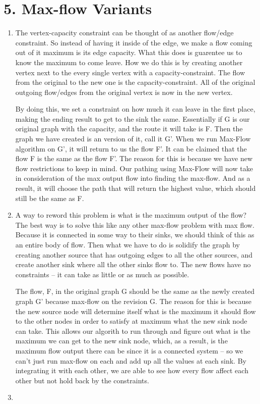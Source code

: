 \documentclass[11pt]{article}
\newenvironment{qparts}{\begin{enumerate}[{(}a{)}]}{\end{enumerate}}
\begin{document}
\section*{5. Max-flow Variants}
\begin{qparts}
\item The vertex-capacity constraint can be thought of as another flow/edge constraint. So instead of having it inside of the edge, we make a flow coming out of it maximum is its edge capacity. What this does is guarentee us to know the maximum to come leave. How we do this is by creating another vertex next to the every single vertex with a capacity-constraint. The flow from the original to the new one is the capacity-constraint. All of the original outgoing flow/edges from the original vertex is now in the new vertex. 

By doing this, we set a constraint on how much it can leave in the first place, making the ending result to get to the sink the same. Essentially if G is our original graph with the capacity, and the route it will take is F. Then the graph we have created is an version of it, call it G'. When we run Max-Flow algorithm on G', it will return to us the flow F'. It can be claimed that the flow F is the same as the flow F'. The reason for this is because we have new flow restrictions to keep in mind. Our pathing using Max-Flow will now take in consideration of the max output flow into finding the max-flow. And as a result, it will choose the path that will return the highest value, which should still be the same as F.

\item A way to reword this problem is what is the maximum output of the flow? The best way is to solve this like any other max-flow problem with max flow. Because it is connected in some way to their sinks, we should think of this as an entire body of flow. Then what we have to do is solidify the graph by creating another source that has outgoing edges to all the other sources, and create another sink where all the other sinks flow to. The new flows have no constraints -- it can take as little or as much as possible. 

The flow, F, in the original graph G should be the same as the newly created graph G' because max-flow on the revision G. The reason for this is because the new source node will determine itself what is the maximum it should flow to the other nodes in order to satisfy at maximum what the new sink node can take. This allows our algorith to run through and figure out what is the maximum we can get to the new sink node, which, as a result, is the maximum flow output there can be since it is a connected system -- so we can't just run max-flow on each and add up all the values at each sink. By integrating it with each other, we are able to see how every flow affect each other but not hold back by the constraints. 

\item 
\end{qparts}
\newpage
\end{document}

